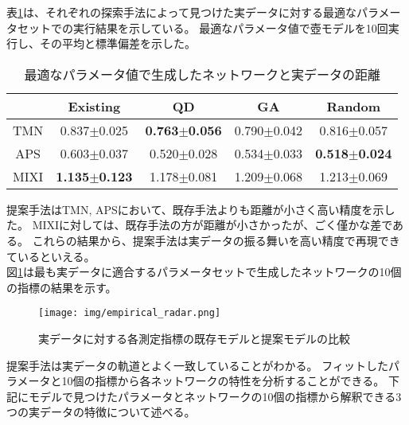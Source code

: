 \documentclass[uplatex,11pt,openany]{ujreport}
\begin{document}
            表\ref{tab:best_distance}は、それぞれの探索手法によって見つけた実データに対する最適なパラメータセットでの実行結果を示している。
            最適なパラメータ値で壺モデルを10回実行し、その平均と標準偏差を示した。
            \begin{table}[H]
                \centering
                \caption{最適なパラメータ値で生成したネットワークと実データの距離}
                \label{tab:best_distance}
                \begin{tabular}{ccccc}
                \hline
                     & Existing & QD & GA & Random \\ \hline
                TMN  & 0.837$\pm$0.025     & \textbf{0.763$\pm$0.056}       & 0.790$\pm$0.042       & 0.816$\pm$0.057   \\
                APS  & 0.603$\pm$0.037     & 0.520$\pm$0.028       & 0.534$\pm$0.033       & \textbf{0.518$\pm$0.024}   \\
                MIXI & \textbf{1.135$\pm$0.123}     & 1.178$\pm$0.081       & 1.209$\pm$0.068       & 1.213$\pm$0.069   \\ \hline
                \end{tabular}
            \end{table}
            提案手法はTMN, APSにおいて、既存手法よりも距離が小さく高い精度を示した。
            MIXIに対しては、既存手法の方が距離が小さかったが、ごく僅かな差である。
            これらの結果から、提案手法は実データの振る舞いを高い精度で再現できているといえる。\\

            図\ref{fig:radar_chart}は最も実データに適合するパラメータセットで生成したネットワークの10個の指標の結果を示す。
            \begin{figure}[H]
                \centering
                \texttt{[image: img/empirical\_radar.png]}
                \caption{実データに対する各測定指標の既存モデルと提案モデルの比較}
                \label{fig:radar_chart}
            \end{figure}
            提案手法は実データの軌道とよく一致していることがわかる。
            フィットしたパラメータと10個の指標から各ネットワークの特性を分析することができる。
            下記にモデルで見つけたパラメータとネットワークの10個の指標から解釈できる3つの実データの特徴について述べる。
\end{document}
